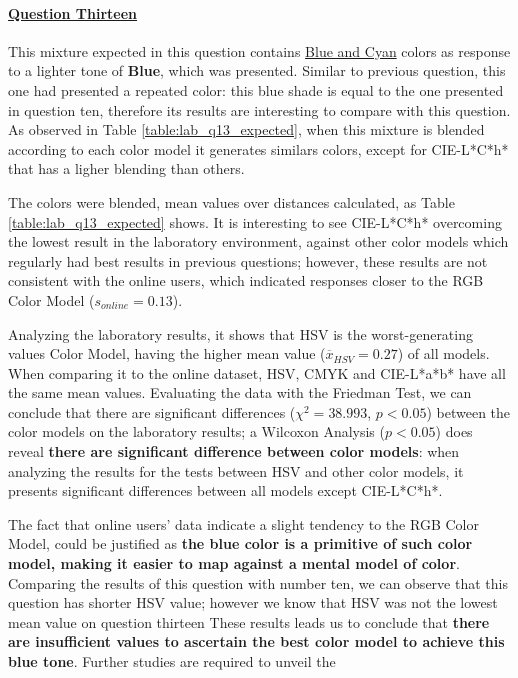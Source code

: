 \paragraph{\ul{Question Thirteen}}
%
This mixture expected in this question contains \ul{Blue and Cyan} colors as response to a lighter tone of \textbf{Blue}, which was presented. Similar to previous question, this one had
presented a repeated color: this blue shade is equal to the one presented in question ten, therefore its results are interesting to compare with this question. As observed in Table
\ref{table:lab_q13_expected}, when this mixture is blended according to each color model it generates similars colors, except for CIE-L*C*h* that has a ligher blending than others. \par
%
The colors were blended, mean values over distances calculated, as Table \ref{table:lab_q13_expected} shows. It is interesting to see CIE-L*C*h* overcoming the lowest result in the laboratory environment, against other
color models which regularly had best results in previous questions; however, these results are not consistent with the online users, which indicated responses closer to the RGB Color Model
($s_{online} = 0.13$). \par
%
Analyzing the laboratory results, it shows that HSV is the worst-generating values Color Model, having the higher mean value ($\overline{x}_{HSV} = 0.27$) of all models. When comparing it to the online dataset,
HSV, CMYK and CIE-L*a*b* have all the same mean values. Evaluating the data with the Friedman Test, we can conclude that there are significant differences ($\chi^2 = 38.993$, $p < 0.05$)
between the color models on the laboratory results; a Wilcoxon Analysis ($p < 0.05$) does reveal \textbf{there are significant difference between color models}: when analyzing the results for the tests between HSV and other
color models, it presents significant differences between all models except CIE-L*C*h*. \par
%
The fact that online users' data indicate a slight tendency to the RGB Color Model, could be justified as \textbf{the blue color is a primitive of such color model, making it easier to map against
a mental model of color}.
Comparing the results of this question with number ten, we can observe that this question has shorter HSV value; however we know that HSV was not the lowest mean value on question thirteen
These results leads us to conclude that \textbf{there are insufficient values to ascertain the best color model to achieve this blue tone}. Further studies are required to unveil the
